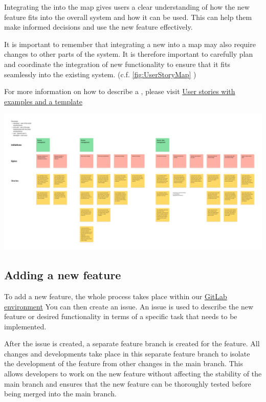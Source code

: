 \documentclass[12pt]{article}
\newcounter{fr}
\begin{document}
Integrating the  into the map gives users a clear understanding of how the new feature fits into the overall system and how it can be used. This can help them make informed decisions and use the new feature effectively.

It is important to remember that integrating a new  into a map may also require changes to other parts of the system. It is therefore important to carefully plan and coordinate the integration of new functionality to ensure that it fits seamlessly into the existing system. (c.f. \autoref{fig:UserStoryMap} )

For more information on how to describe a , please visit \href{https://www.atlassian.com/agile/project-management/user-stories}{User stories with examples and a template}

 \includegraphics[width=\textwidth]{user_story_map.png}
 \label{fig:UserStoryMap}
 

\subsection{Adding a new feature}

To add a new feature, the whole process takes place within our \href{https://gitlab.uni-ulm.de/se-anwendungsprojekt-22-23}{GitLab environment}
You can then create an issue. An issue is used to describe the new feature or desired functionality in terms of a specific task that needs to be implemented.

After the issue is created, a separate feature branch is created for the feature. All changes and developments take place in this separate feature branch to isolate the development of the feature from other changes in the main branch. This allows developers to work on the new feature without affecting the stability of the main branch and ensures that the new feature can be thoroughly tested before being merged into the main branch.
\end{document}

